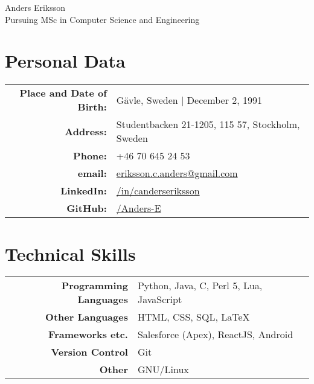 \documentclass[a4paper,10pt]{article}
\begin{document}
\pagestyle{empty} %


\par{
    \centering
	{
	    \Huge \bitter Anders Eriksson \\
	    \normalfont
	    \normalsize Pursuing MSc in Computer Science and Engineering
	}
	\bigskip\par
}

\section{Personal Data}

\begin{tabular}{rl}
    \textbf{Place and Date of Birth:} & Gävle, Sweden  | December 2, 1991 \\
    \textbf{Address:}   & Studentbacken 21-1205, 115 57, Stockholm, Sweden \\
    \textbf{Phone:}     & +46 70 645 24 53\\
    \textbf{email:}     & \href{mailto:eriksson.c.anders@gmail.com
}{eriksson.c.anders@gmail.com}\\
    \textbf{LinkedIn:}	& \href{http://se.linkedin.com/in/canderseriksson}{/in/canderseriksson}\\
    \textbf{GitHub:}	& \href{http://github.com/Anders-E}{/Anders-E}
\end{tabular}

\section{Technical Skills}
\begin{tabular}{r|l}
\textbf{Programming Languages} & Python, Java, C, Perl 5, Lua, JavaScript \\
\textbf{Other Languages} & HTML, CSS, SQL, \LaTeX \\
\textbf{Frameworks etc.} & Salesforce (Apex), ReactJS, Android \\
\textbf{Version Control} & Git \\
\textbf{Other} & GNU/Linux\\
\end{tabular}
\end{document}
